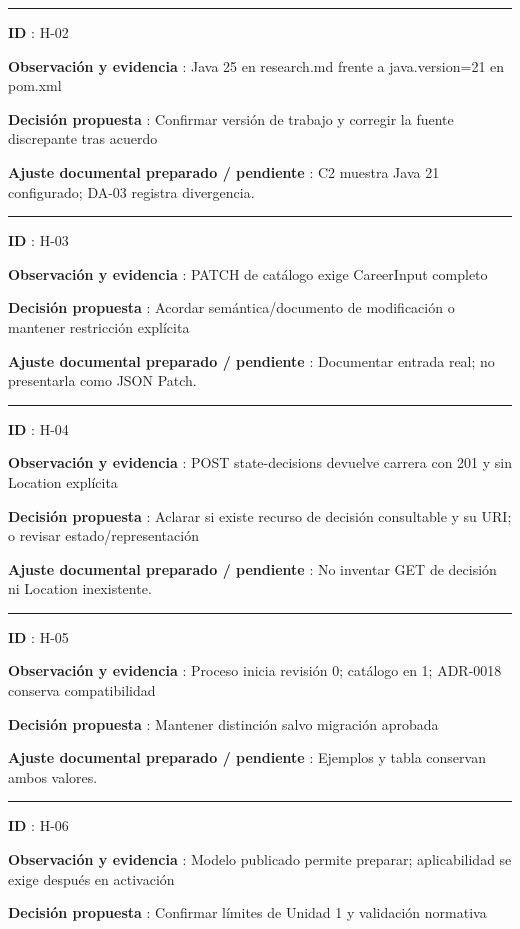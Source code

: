 \documentclass[12pt,a4paper]{report}
\begin{document}
\medskip\hrule\medskip

\textbf{ID }: H-02

\textbf{Observación y evidencia }: Java 25 en research.md frente a
java.version=21 en pom.xml

\textbf{Decisión propuesta }: Confirmar versión de trabajo y corregir la
fuente discrepante tras acuerdo

\textbf{Ajuste documental preparado / pendiente }: C2 muestra Java 21
configurado; DA-03 registra divergencia.

\medskip\hrule\medskip

\textbf{ID }: H-03

\textbf{Observación y evidencia }: PATCH de catálogo exige CareerInput
completo

\textbf{Decisión propuesta }: Acordar semántica/documento de
modificación o mantener restricción explícita

\textbf{Ajuste documental preparado / pendiente }: Documentar entrada
real; no presentarla como JSON Patch.

\medskip\hrule\medskip

\textbf{ID }: H-04

\textbf{Observación y evidencia }: POST state-decisions devuelve carrera
con 201 y sin Location explícita

\textbf{Decisión propuesta }: Aclarar si existe recurso de decisión
consultable y su URI; o revisar estado/representación

\textbf{Ajuste documental preparado / pendiente }: No inventar GET de
decisión ni Location inexistente.

\medskip\hrule\medskip

\textbf{ID }: H-05

\textbf{Observación y evidencia }: Proceso inicia revisión 0; catálogo
en 1; ADR-0018 conserva compatibilidad

\textbf{Decisión propuesta }: Mantener distinción salvo migración
aprobada

\textbf{Ajuste documental preparado / pendiente }: Ejemplos y tabla
conservan ambos valores.

\medskip\hrule\medskip

\textbf{ID }: H-06

\textbf{Observación y evidencia }: Modelo publicado permite preparar;
aplicabilidad se exige después en activación

\textbf{Decisión propuesta }: Confirmar límites de Unidad 1 y validación
normativa
\end{document}

